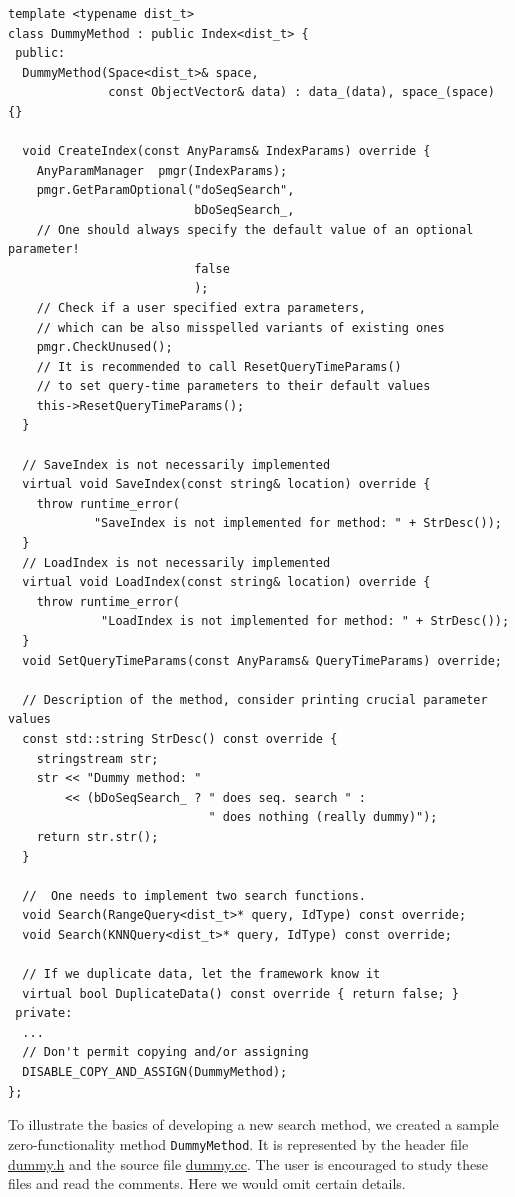 \documentclass[runningheads,a4paper]{llncs}
\newcommand{\replocfile}{https://github.com/searchivarius/nmslib/blob/v1.5/}
\newcommand{\ttt}[1]{\texttt{#1}}
\begin{document}
\begin{table}[[!htbp]
\caption{\label{FigDummyMethod}A sample search method class}
\begin{verbatim}
template <typename dist_t>
class DummyMethod : public Index<dist_t> {
 public:
  DummyMethod(Space<dist_t>& space, 
              const ObjectVector& data) : data_(data), space_(space) {}

  void CreateIndex(const AnyParams& IndexParams) override {
    AnyParamManager  pmgr(IndexParams);
    pmgr.GetParamOptional("doSeqSearch",  
                          bDoSeqSearch_, 
    // One should always specify the default value of an optional parameter!
                          false
                          );
    // Check if a user specified extra parameters, 
    // which can be also misspelled variants of existing ones
    pmgr.CheckUnused();
    // It is recommended to call ResetQueryTimeParams() 
    // to set query-time parameters to their default values
    this->ResetQueryTimeParams();
  }

  // SaveIndex is not necessarily implemented
  virtual void SaveIndex(const string& location) override {
    throw runtime_error(
            "SaveIndex is not implemented for method: " + StrDesc());
  }
  // LoadIndex is not necessarily implemented
  virtual void LoadIndex(const string& location) override {
    throw runtime_error(
             "LoadIndex is not implemented for method: " + StrDesc());
  }
  void SetQueryTimeParams(const AnyParams& QueryTimeParams) override;

  // Description of the method, consider printing crucial parameter values
  const std::string StrDesc() const override { 
    stringstream str;
    str << "Dummy method: " 
        << (bDoSeqSearch_ ? " does seq. search " : 
                            " does nothing (really dummy)"); 
    return str.str();
  }

  //  One needs to implement two search functions.
  void Search(RangeQuery<dist_t>* query, IdType) const override;
  void Search(KNNQuery<dist_t>* query, IdType) const override;

  // If we duplicate data, let the framework know it
  virtual bool DuplicateData() const override { return false; }
 private:
  ...
  // Don't permit copying and/or assigning 
  DISABLE_COPY_AND_ASSIGN(DummyMethod);
};
\end{verbatim}
\end{table}

To illustrate the basics of developing a new search method,
we created a sample zero-functionality method \ttt{DummyMethod}.
It is represented by 
the header file 
\href{\replocfile similarity_search/include/method/dummy.h}{dummy.h}
and the source file
\href{\replocfile similarity_search/src/method/dummy.cc}{dummy.cc}.
The user is encouraged to study these files and read the comments.
Here we would omit certain details.
\end{document}
